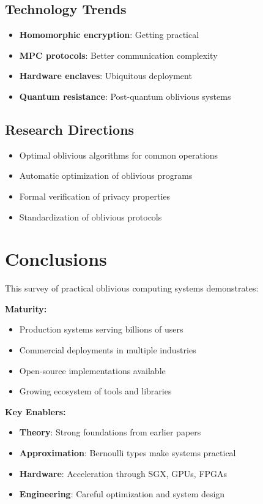 \documentclass[11pt,final,hidelinks]{article}
\begin{document}
\subsection{Technology Trends}

\begin{itemize}
    \item \textbf{Homomorphic encryption}: Getting practical
    \item \textbf{MPC protocols}: Better communication complexity
    \item \textbf{Hardware enclaves}: Ubiquitous deployment
    \item \textbf{Quantum resistance}: Post-quantum oblivious systems
\end{itemize}

\subsection{Research Directions}

\begin{itemize}
    \item Optimal oblivious algorithms for common operations
    \item Automatic optimization of oblivious programs
    \item Formal verification of privacy properties
    \item Standardization of oblivious protocols
\end{itemize}

\section{Conclusions}

This survey of practical oblivious computing systems demonstrates:

\textbf{Maturity:}
\begin{itemize}
    \item Production systems serving billions of users
    \item Commercial deployments in multiple industries
    \item Open-source implementations available
    \item Growing ecosystem of tools and libraries
\end{itemize}

\textbf{Key Enablers:}
\begin{itemize}
    \item \textbf{Theory}: Strong foundations from earlier papers
    \item \textbf{Approximation}: Bernoulli types make systems practical
    \item \textbf{Hardware}: Acceleration through SGX, GPUs, FPGAs
    \item \textbf{Engineering}: Careful optimization and system design
\end{itemize}
\end{document}
